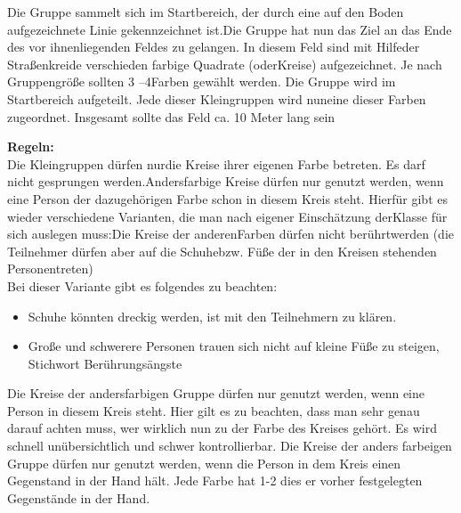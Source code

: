 Die Gruppe sammelt sich im Startbereich, der durch eine auf den Boden aufgezeichnete Linie gekennzeichnet ist.Die Gruppe hat nun das Ziel an das Ende des vor ihnenliegenden Feldes zu gelangen. In diesem Feld sind mit Hilfeder Straßenkreide verschieden farbige Quadrate (oderKreise) aufgezeichnet. Je nach Gruppengröße sollten 3 –4Farben gewählt werden. Die Gruppe wird im Startbereich aufgeteilt. Jede dieser Kleingruppen wird nuneine dieser Farben zugeordnet. Insgesamt sollte das Feld ca. 10 Meter lang sein

\textbf{Regeln:}\\
Die Kleingruppen dürfen nurdie Kreise ihrer eigenen Farbe betreten. Es darf nicht gesprungen werden.Andersfarbige Kreise dürfen nur genutzt werden, wenn eine Person der dazugehörigen Farbe schon in diesem Kreis steht. Hierfür gibt es wieder verschiedene Varianten, die man nach eigener Einschätzung derKlasse für sich auslegen muss:Die Kreise der anderenFarben dürfen nicht berührtwerden (die Teilnehmer dürfen aber auf die Schuhebzw. Füße der in den Kreisen stehenden Personentreten)\\
Bei dieser Variante gibt es folgendes zu beachten:
\begin{itemize}
    \item Schuhe könnten dreckig werden, ist mit den Teilnehmern zu klären.
    \item Große und schwerere Personen trauen sich nicht auf kleine Füße zu steigen,\\ Stichwort Berührungsängste
\end{itemize}
Die Kreise der andersfarbigen Gruppe dürfen nur genutzt werden, wenn eine Person in diesem Kreis steht. Hier gilt es zu beachten, dass man sehr genau darauf achten muss, wer wirklich nun zu der Farbe des Kreises gehört. Es wird schnell unübersichtlich und schwer kontrollierbar. Die Kreise der anders farbeigen Gruppe dürfen nur genutzt werden, wenn die Person in dem Kreis einen Gegenstand in der Hand hält. Jede Farbe hat 1-2 dies er vorher festgelegten Gegenstände in der Hand.

